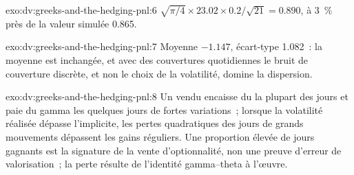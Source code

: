 \begin{solution}{exo:dv:greeks-and-the-hedging-pnl:6}
$\sqrt{\pi/4}\times23.02\times0.2/\sqrt{21}=0.890$, à 3~\% près de la valeur simulée 0.865.
\end{solution}

\begin{solution}{exo:dv:greeks-and-the-hedging-pnl:7}
Moyenne $-1.147$, écart-type 1.082~: la moyenne est inchangée, et avec des couvertures quotidiennes
le bruit de couverture discrète, et non le choix de la volatilité, domine la dispersion.
\end{solution}

\begin{solution}{exo:dv:greeks-and-the-hedging-pnl:8}
Un  vendu encaisse du  la plupart des jours et paie du gamma les quelques jours de fortes
variations~; lorsque la volatilité réalisée dépasse l'implicite, les pertes quadratiques des jours de grands mouvements dépassent les
gains réguliers. Une proportion élevée de jours gagnants est la signature de la vente
d'optionnalité, non une preuve d'erreur de valorisation~; la perte résulte de l'identité gamma--theta à
l'œuvre.
\end{solution}

